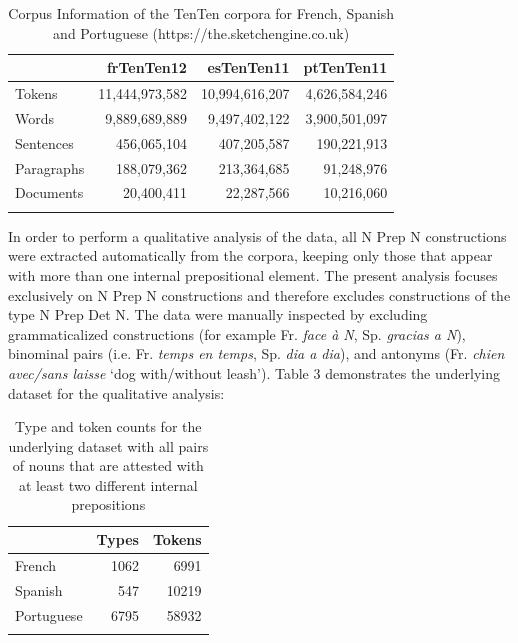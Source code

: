 \documentclass[output=paper]{langsci/langscibook}
\begin{document}
\begin{table}
\caption{Corpus Information of the TenTen corpora for French, Spanish and Portuguese (https://the.sketchengine.co.uk)}
\label{tab:1:frequencies}
 \begin{tabular}{lrrr} 
  \lsptoprule
            & frTenTen12 & esTenTen11 & ptTenTen11 \\ 
  \midrule
  Tokens  &   11,444,973,582 &    10,994,616,207     & 4,626,584,246\\
  Words  &   9,889,689,889 &  9,497,402,122 &    3,900,501,097\\
  Sentences  &  456,065,104 &  407,205,587 &    190,221,913\\
  Paragraphs  &  188,079,362 &  213,364,685 &    91,248,976\\
   Documents  &  20,400,411 &  22,287,566 &    10,216,060\\
  \lspbottomrule
 \end{tabular}
\end{table}


\newpage In order to perform a qualitative analysis of the data, all N Prep N constructions were extracted automatically from the corpora, keeping only those that appear with more than one internal prepositional element. The present analysis focuses exclusively on N Prep N constructions and therefore excludes constructions of the type N Prep Det N. The data were manually inspected by excluding grammaticalized constructions (for example Fr. \textit{face à N}, Sp. \textit{gracias a N}), binominal pairs (i.e. Fr. \textit{temps en temps}, Sp. \textit{dia a dia}), and antonyms (Fr. \textit{chien avec/sans laisse} `dog with/without leash'). Table 3 demonstrates the underlying dataset for the qualitative analysis:

\begin{table}
\caption{Type and token counts for the underlying dataset with all pairs of nouns that are attested with at least two different internal prepositions}
\label{tab:2:frequencies}
 \begin{tabular}{lrr} 
  \lsptoprule
            & Types & Tokens \\ 
  \midrule
  French  &   1062 &    6991     \\
  Spanish  &  547 &  10219 \\
  Portuguese  &  6795 &  58932 \\
  \lspbottomrule
 \end{tabular}
\end{table}
\end{document}
